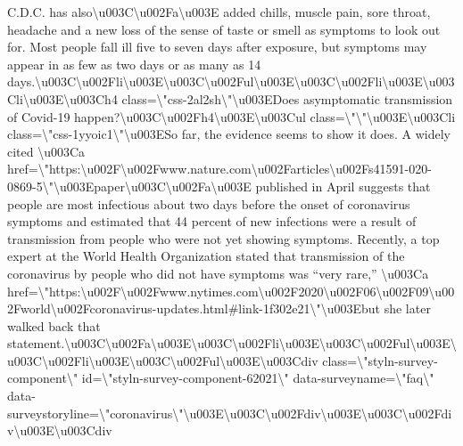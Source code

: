 C.D.C. has
also\textbackslash{}u003C\textbackslash{}u002Fa\textbackslash{}u003E
added chills, muscle pain, sore throat, headache and a new loss of the
sense of taste or smell as symptoms to look out for. Most people fall
ill five to seven days after exposure, but symptoms may appear in as few
as two days or as many as 14
days.\textbackslash{}u003C\textbackslash{}u002Fli\textbackslash{}u003E\textbackslash{}u003C\textbackslash{}u002Ful\textbackslash{}u003E\textbackslash{}u003C\textbackslash{}u002Fli\textbackslash{}u003E\textbackslash{}u003Cli\textbackslash{}u003E\textbackslash{}u003Ch4
class=\textbackslash{}"css-2al2sh\textbackslash{}"\textbackslash{}u003EDoes
asymptomatic transmission of Covid-19
happen?\textbackslash{}u003C\textbackslash{}u002Fh4\textbackslash{}u003E\textbackslash{}u003Cul
class=\textbackslash{}"\textbackslash{}"\textbackslash{}u003E\textbackslash{}u003Cli
class=\textbackslash{}"css-1yyoic1\textbackslash{}"\textbackslash{}u003ESo
far, the evidence seems to show it does. A widely cited
\textbackslash{}u003Ca
href=\textbackslash{}"https:\textbackslash{}u002F\textbackslash{}u002Fwww.nature.com\textbackslash{}u002Farticles\textbackslash{}u002Fs41591-020-0869-5\textbackslash{}"\textbackslash{}u003Epaper\textbackslash{}u003C\textbackslash{}u002Fa\textbackslash{}u003E
published in April suggests that people are most infectious about two
days before the onset of coronavirus symptoms and estimated that 44
percent of new infections were a result of transmission from people who
were not yet showing symptoms. Recently, a top expert at the World
Health Organization stated that transmission of the coronavirus by
people who did not have symptoms was ``very rare,''
\textbackslash{}u003Ca
href=\textbackslash{}"https:\textbackslash{}u002F\textbackslash{}u002Fwww.nytimes.com\textbackslash{}u002F2020\textbackslash{}u002F06\textbackslash{}u002F09\textbackslash{}u002Fworld\textbackslash{}u002Fcoronavirus-updates.html\#link-1f302e21\textbackslash{}"\textbackslash{}u003Ebut
she later walked back that
statement.\textbackslash{}u003C\textbackslash{}u002Fa\textbackslash{}u003E\textbackslash{}u003C\textbackslash{}u002Fli\textbackslash{}u003E\textbackslash{}u003C\textbackslash{}u002Ful\textbackslash{}u003E\textbackslash{}u003C\textbackslash{}u002Fli\textbackslash{}u003E\textbackslash{}u003C\textbackslash{}u002Ful\textbackslash{}u003E\textbackslash{}u003Cdiv
class=\textbackslash{}"styln-survey-component\textbackslash{}"
id=\textbackslash{}"styln-survey-component-62021\textbackslash{}"
data-surveyname=\textbackslash{}"faq\textbackslash{}"
data-surveystoryline=\textbackslash{}"coronavirus\textbackslash{}"\textbackslash{}u003E\textbackslash{}u003C\textbackslash{}u002Fdiv\textbackslash{}u003E\textbackslash{}u003C\textbackslash{}u002Fdiv\textbackslash{}u003E\textbackslash{}u003Cdiv
